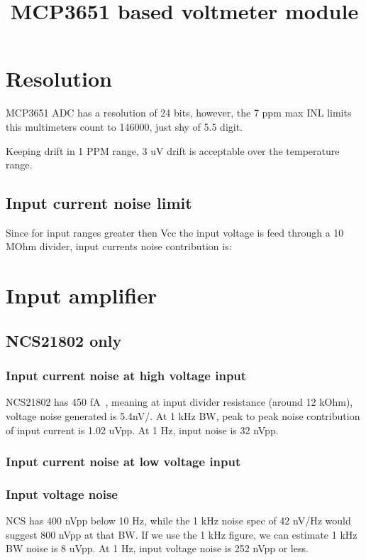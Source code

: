 \documentclass[11pt]{article}
\title{MCP3651 based voltmeter module}
\begin{document}
\maketitle
\pagebreak
\tableofcontents
\pagebreak



\section{Resolution}
MCP3651 ADC has a resolution of 24 bits, however, the 7 ppm max 
INL limits this multimeters count to 146000, just shy of 5.5 digit.

Keeping drift in 1 PPM range, 3 uV drift is acceptable over the 
temperature range.

\subsection{Input current noise limit}
Since for input ranges greater then Vcc the input voltage is feed through
a 10 MOhm divider, input currents noise contribution is:

\section{Input amplifier}

\subsection{NCS21802 only}

\subsubsection{Input current noise at high voltage input}
NCS21802 has 450 \si{\femto \ampere \sqrt{\hertz}}, meaning at input divider
resistance (around 12 kOhm), voltage noise generated is 5.4\si{nV/}.
At 1 kHz BW, peak to peak noise contribution of input current is 1.02 uVpp.
At 1 Hz, input noise is 32 nVpp.

\subsubsection{Input current noise at low voltage input}

\subsubsection{Input voltage noise}
NCS has 400 nVpp below 10 Hz, while the 1 kHz noise spec of 42 nV/Hz would 
suggest 800 nVpp at that BW. If we use the 1 kHz figure, we can estimate 
1 kHz BW noise is 8 uVpp. At 1 Hz, input voltage noise is 252 nVpp or less.
\end{document}

